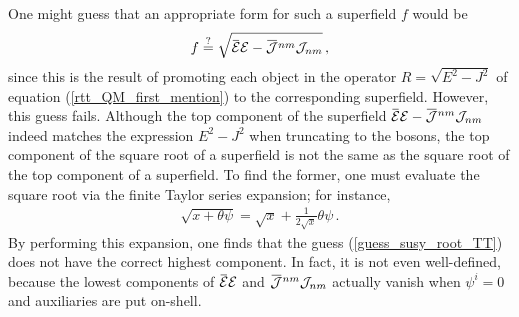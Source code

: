 \documentclass[12pt]{article}
\numberwithin{equation}{section}
\newcommand{\overbar}[1]{\mkern 1.5mu\overline{\mkern-1.5mu#1\mkern-1.5mu}\mkern 1.5mu}
\def\cEb{{\overbar{\mathcal{E}}}}
\def\cE{{\mathcal{E}}}
\begin{document}
One might guess that an appropriate form for such a superfield $f$ would be
%
\begin{align}\label{guess_susy_root_TT}
    f \overset{?}{=} \sqrt{ \cEb \cE  - \overbar{\mathcal{J}}^{nm} \mathcal{J}_{nm}  } \, , 
\end{align}
%
since this is the result of promoting each object in the operator $R = \sqrt{ E^2 - J^2 }$ of equation (\ref{rtt_QM_first_mention}) to the corresponding superfield. However, this guess fails. Although the top component of the superfield $\cEb \cE - \overbar{\mathcal{J}}^{nm} \mathcal{J}_{nm} $ indeed matches the expression $E^2 - J^2$ when truncating to the bosons, the top component of the square root of a superfield is not the same as the square root of the top component of a superfield. To find the former, one must evaluate the square root via the finite Taylor series expansion; for instance,
%
\begin{align}
    \sqrt{ x + \theta \psi } = \sqrt{x} + \frac{1}{2 \sqrt{x}} \theta \psi \, .
\end{align}
%
By performing this expansion, one finds that the guess (\ref{guess_susy_root_TT}) does not have the correct highest component. In fact, it is not even well-defined, because the lowest components of $\cEb \cE$ and $\overbar{\mathcal{J}}^{nm} \mathcal{J}_{nm}$ actually vanish when $\psi^i = 0$ and auxiliaries are put on-shell.
\end{document}
